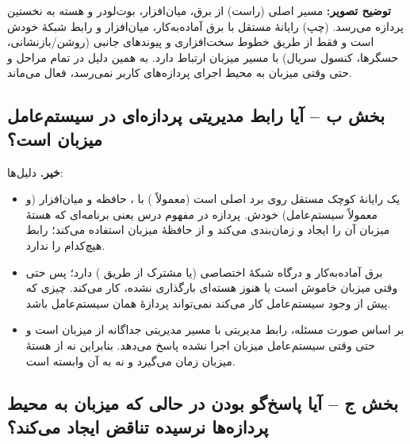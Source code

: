 \begin{center}
\end{center}

\textbf{توضیح تصویر:} مسیر اصلی (راست) از برق، میان‌افزار، بوت‌لودر و هسته به نخستین پردازه می‌رسد.  (چپ) رایانهٔ مستقل با برق آماده‌به‌کار، میان‌افزار و رابط شبکهٔ خودش است و فقط از طریق خطوط سخت‌افزاری و پیوندهای جانبی (روشن/بازنشانی، حسگرها، کنسول سریال) با مسیر میزبان ارتباط دارد. به همین دلیل در تمام مراحل و حتی وقتی میزبان به محیط اجرای پردازه‌های کاربر نمی‌رسد، فعال می‌ماند.

\subsection*{بخش ب – آیا رابط مدیریتی  پردازه‌ای در سیستم‌عامل میزبان است؟}

\textbf{خیر.} دلیل‌ها:
\begin{itemize}
  \item {} یک رایانهٔ کوچک مستقل روی برد اصلی است (معمولاً ) با ، حافظه و میان‌افزار (و معمولاً سیستم‌عامل) خودش. پردازه در مفهوم درس یعنی برنامه‌ای که هستهٔ میزبان آن را ایجاد و زمان‌بندی می‌کند و از حافظهٔ میزبان استفاده می‌کند؛ رابط  هیچ‌کدام را ندارد.
  \item برق آماده‌به‌کار و درگاه شبکهٔ اختصاصی (یا مشترک از طریق ) دارد؛ پس حتی وقتی میزبان خاموش است یا هنوز هسته‌ای بارگذاری نشده، کار می‌کند. چیزی که پیش از وجود سیستم‌عامل کار می‌کند نمی‌تواند پردازهٔ همان سیستم‌عامل باشد.
  \item بر اساس صورت مسئله، رابط مدیریتی با مسیر مدیریتی جداگانه از میزبان است و حتی وقتی سیستم‌عامل میزبان اجرا نشده پاسخ می‌دهد. بنابراین نه از هستهٔ میزبان زمان می‌گیرد و نه به آن وابسته است.
\end{itemize}

\subsection*{بخش ج – آیا پاسخ‌گو بودن  در حالی که میزبان به محیط پردازه‌ها نرسیده تناقض ایجاد می‌کند؟}

